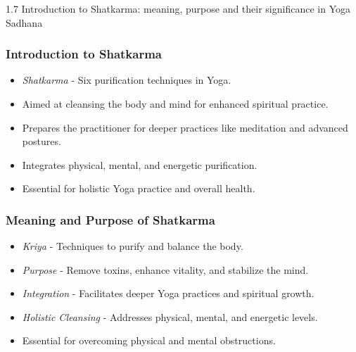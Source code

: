 \begin{frame}[fragile]\frametitle{}
\begin{center}
{\Large 1.7 Introduction to Shatkarma: meaning, purpose and their significance in Yoga Sadhana}
\end{center}
\end{frame}

\begin{frame}[fragile]\frametitle{Introduction to Shatkarma}

      \begin{itemize}
		\item \textit{Shatkarma} - Six purification techniques in Yoga.
		\item Aimed at cleansing the body and mind for enhanced spiritual practice.
		\item Prepares the practitioner for deeper practices like meditation and advanced postures.
		\item Integrates physical, mental, and energetic purification.
		\item Essential for holistic Yoga practice and overall health.
	  \end{itemize}

\end{frame}

\begin{frame}[fragile]\frametitle{Meaning and Purpose of Shatkarma}

      \begin{itemize}
		\item \textit{Kriya} - Techniques to purify and balance the body.
		\item \textit{Purpose} - Remove toxins, enhance vitality, and stabilize the mind.
		\item \textit{Integration} - Facilitates deeper Yoga practices and spiritual growth.
		\item \textit{Holistic Cleansing} - Addresses physical, mental, and energetic levels.
		\item Essential for overcoming physical and mental obstructions.
	  \end{itemize}

\end{frame}

